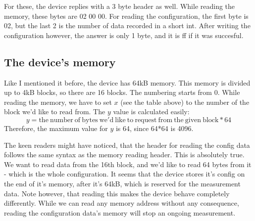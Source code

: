 \documentclass[a4paper,12pt]{article}
\begin{document}
For these, the device replies with a 3 byte header as well. While reading the memory, these bytes are 02 00 00. For reading the configuration, the first byte is 02, but the last 2 is the number of data recorded in a short int. After writing the configuration however, the answer is only 1 byte, and it is ff if it was succesful. 

\subsection{The device's memory}
Like I mentioned it before, the device has 64kB memory. This memory is divided up to 4kB blocks, so there are 16 blocks. The numbering starts from 0. While reading the memory, we have to set $x$ (see the table above) to the number of the block we'd like to read from. The $y$ value is calculated easily:
\begin{equation}
y=\mathrm{the\ number\ of\ bytes\ we'd\ like\ to\ request\ from\ the\ given\ block}*64
\end{equation}
Therefore, the maximum value for $y$ is 64, since 64*64 is 4096.

The keen readers might have noticed, that the header for reading the config data follows the same syntax as the memory reading header. This is absolutely true. We want to read data from the 16th block, and we'd like to read 64 bytes from it - which is the whole configuration. It seems that the device stores it's config on the end of it's memory, after it's 64kB, which is reserved for the measurement data. Note however, that reading this makes the device behave completely differently. While we can read any memory address without any consequence, reading the configuration data's memory will stop an ongoing measurement.
\end{document}

